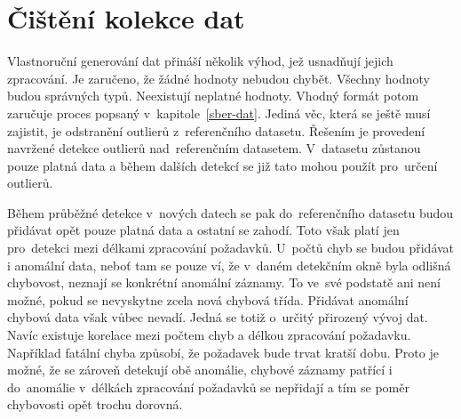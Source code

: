 \section{Čištění kolekce dat}
\label{cisteni-kolekce-dat}
Vlastnoruční generování dat přináší několik výhod, jež usnadňují jejich zpracování. Je zaručeno, že žádné hodnoty nebudou chybět. Všechny hodnoty budou správných typů. Neexistují neplatné hodnoty. Vhodný formát potom zaručuje proces popsaný v~kapitole~\ref{sber-dat}. Jediná věc, která se ještě musí zajistit, je odstranění outlierů z~referenčního datasetu. Řešením je provedení navržené detekce outlierů nad~referenčním datasetem. V~datasetu zůstanou pouze platná data a během dalších detekcí se již tato mohou použít pro~určení outlierů.

Během průběžné detekce v~nových datech se pak do~referenčního datasetu budou přidávat opět pouze platná data a ostatní se zahodí. Toto však platí jen pro~detekci mezi délkami zpracování požadavků. U~počtů chyb se budou přidávat i anomální data, neboť tam se pouze ví, že v~daném detekčním okně byla odlišná chybovost, neznají se konkrétní anomální záznamy. To ve~své podstatě ani není možné, pokud se nevyskytne zcela nová chybová třída. Přidávat anomální chybová data však vůbec nevadí. Jedná se totiž o~určitý přirozený vývoj dat. Navíc existuje korelace mezi počtem chyb a délkou zpracování požadavku. Například fatální chyba způsobí, že požadavek bude trvat kratší dobu. Proto je možné, že se zároveň detekují obě anomálie, chybové záznamy patřící i do~anomálie v~délkách zpracování požadavků se nepřidají a tím se poměr chybovosti opět trochu dorovná.